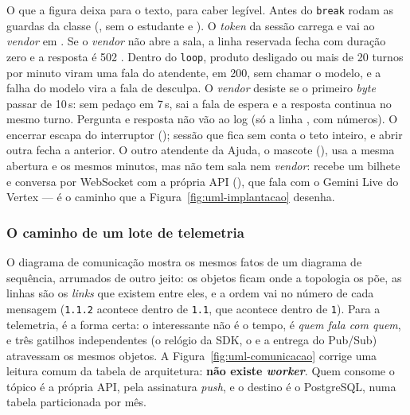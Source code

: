 O que a figura deixa para o texto, para caber legível. Antes do \texttt{break}
rodam as guardas da classe (,  sem o estudante e
). O \emph{token} da sessão carrega
 e vai ao \emph{vendor} em
. Se o \emph{vendor} não abre a sala, a linha
reservada fecha com duração zero e a resposta é 502 . Dentro
do \texttt{loop}, produto desligado ou mais de 20 turnos por minuto viram uma fala
do atendente, em 200, sem chamar o modelo, e a falha do modelo vira a fala de
desculpa. O \emph{vendor} desiste se o primeiro \emph{byte} passar de 10\,s: sem
pedaço em 7\,s, sai a fala de espera e a resposta continua no mesmo turno.
Pergunta e resposta não vão ao log (só a linha , com números). O
encerrar escapa do interruptor (); sessão que fica sem
 conta o teto inteiro, e abrir outra fecha a anterior. O outro atendente
da Ajuda, o mascote (), usa a mesma abertura e os mesmos minutos,
mas não tem sala nem \emph{vendor}: recebe um bilhete e conversa por WebSocket
com a própria API (), que fala com o Gemini Live do
Vertex --- é o caminho que a Figura~\ref{fig:uml-implantacao} desenha.

\subsubsection{O caminho de um lote de telemetria}

O diagrama de comunicação mostra os mesmos fatos de um diagrama de sequência,
arrumados de outro jeito: os objetos ficam onde a topologia os põe, as linhas são
os \emph{links} que existem entre eles, e a ordem vai no número de cada mensagem
(\texttt{1.1.2} acontece dentro de \texttt{1.1}, que acontece dentro de \texttt{1}).
Para a telemetria, é a forma certa: o interessante não é o tempo, é
\emph{quem fala com quem}, e três gatilhos independentes (o relógio da SDK, o
 e a entrega do Pub/Sub) atravessam os mesmos objetos. A
Figura~\ref{fig:uml-comunicacao} corrige uma leitura comum da tabela de
arquitetura: \textbf{não existe \emph{worker}}. Quem consome o tópico é a própria
API, pela assinatura \emph{push}, e o destino é o PostgreSQL, numa tabela
particionada por mês.

